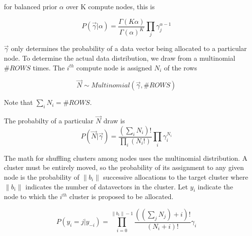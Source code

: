 \documentclass{article}
\begin{document}
for balanced prior $\alpha$ over K compute nodes, this is

\begin{equation}
P(\vec \gamma|\alpha) = \frac{\Gamma(K \alpha)}{\Gamma(\alpha)^K} \prod_j \gamma_j^{\alpha-1}
\end{equation}

$\vec \gamma$ only determines the probability of a data vector being allocated to a particular node.  To determine the actual data distribution, we draw from a multinomial $\#ROWS$ times.  The $i^{th}$ compute node is assigned ${N_i}$ of the rows

\begin{equation}
\vec N \sim Multinomial(\vec \gamma,\#ROWS)
\end{equation}

Note that $\sum_i N_i = \#ROWS$.

The probabilty of a particular $\vec N$ draw is
\begin{equation}
P(\vec N|\vec \gamma) = \frac{(\sum_i N_i)!}{\prod_i (N_i!)} \prod_i \gamma_i^{N_i}
\end{equation}

The math for shuffling clusters among nodes uses the multinomial distribution.  A cluster must be entirely moved, so the probability of its assignment to any given node is the probability of $\|b_i\|$ successive allocations to the target cluster where $\|b_i\|$ indicates the number of datavectors in the cluster.  Let $y_i$ indicate the node to which the $i^{th}$ cluster is proposed to be allocated.

\begin{equation}
P(y_i=j|y_{-i}) = \prod_{i=0}^{\|b_i\|-1} \frac{((\sum_j N_j)+i)!}{(N_i + i)!} \gamma_i
\end{equation}
\end{document}
